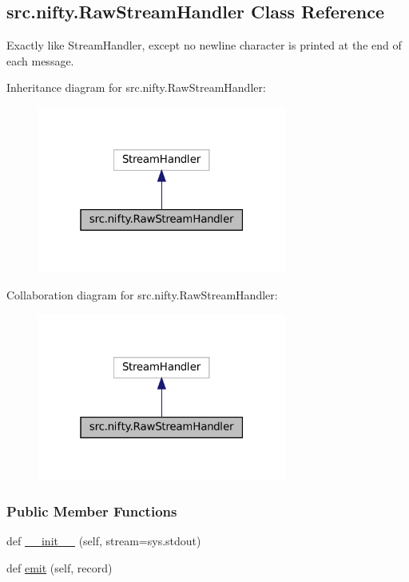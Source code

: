 \hypertarget{classsrc_1_1nifty_1_1RawStreamHandler}{}\subsection{src.\+nifty.\+Raw\+Stream\+Handler Class Reference}
\label{classsrc_1_1nifty_1_1RawStreamHandler}


Exactly like Stream\+Handler, except no newline character is printed at the end of each message.  




Inheritance diagram for src.\+nifty.\+Raw\+Stream\+Handler\+:
\nopagebreak
\begin{figure}[H]
\begin{center}
\leavevmode
\includegraphics[width=232pt]{classsrc_1_1nifty_1_1RawStreamHandler__inherit__graph}
\end{center}
\end{figure}


Collaboration diagram for src.\+nifty.\+Raw\+Stream\+Handler\+:
\nopagebreak
\begin{figure}[H]
\begin{center}
\leavevmode
\includegraphics[width=232pt]{classsrc_1_1nifty_1_1RawStreamHandler__coll__graph}
\end{center}
\end{figure}
\subsubsection*{Public Member Functions}
\begin{DoxyCompactItemize}
\item 
def \hyperlink{classsrc_1_1nifty_1_1RawStreamHandler_a04b9225002425fea4f0614f9e032490c}{\+\_\+\+\_\+init\+\_\+\+\_\+} (self, stream=sys.\+stdout)
\item 
def \hyperlink{classsrc_1_1nifty_1_1RawStreamHandler_ae914fe58b48693de2156e85a730ef81f}{emit} (self, record)
\end{DoxyCompactItemize}



